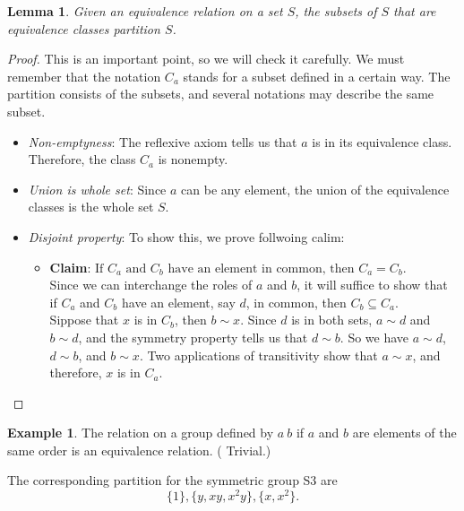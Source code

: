 \documentclass[
]{book}
\providecommand{\tightlist}{%
  \setlength{\itemsep}{0pt}\setlength{\parskip}{0pt}}
\newtheorem{lemma}{Lemma}[chapter]
\theoremstyle{definition}
\theoremstyle{definition}
\newtheorem{example}{Example}[chapter]
\theoremstyle{definition}
\theoremstyle{definition}
\theoremstyle{remark}
\begin{document}
\begin{lemma}
\protect\hypertarget{lem:unnamed-chunk-34}{}\label{lem:unnamed-chunk-34}Given an equivalence relation on a set \(S\), the subsets of \(S\) that are equivalence classes partition \(S\).
\end{lemma}

\begin{proof}

This is an important point, so we will check it carefully. We must remember that the notation \(C_a\) stands for a subset defined in a certain way. The partition consists of the subsets, and several notations may describe the same subset.

\begin{itemize}
\item
  \emph{Non-emptyness}: The reflexive axiom tells us that \(a\) is in its equivalence class. Therefore, the class \(C_a\) is nonempty.
\item
  \emph{Union is whole set}: Since \(a\) can be any element, the union of the equivalence classes is the whole set \(S\).
\item
  \emph{Disjoint property}: To show this, we prove follwoing calim:

  \begin{itemize}
  \tightlist
  \item
    \textbf{Claim}: \(\text{If } C_a \text{ and } C_b \text{ have an element in common, then } C_a = C_b\).\\
    Since we can interchange the roles of \(a\) and \(b\), it will suffice to show that if \(C_a\) and \(C_b\) have an element, say \(d\), in common, then \(C_b \subseteq C_a\).\\
    Sippose that \(x\) is in \(C_b\), then \(b \sim x\). Since \(d\) is in both sets, \(a \sim d\) and \(b \sim d\), and the symmetry property tells us that \(d \sim b\). So we have \(a \sim d\), \(d \sim b\), and \(b \sim x\). Two applications of transitivity show that \(a \sim x\), and therefore, \(x\) is in \(C_a\).
  \end{itemize}
\end{itemize}

\end{proof}

\begin{example}
\protect\hypertarget{exm:272}{}\label{exm:272}The relation on a group defined by \(a ~ b\) if \(a\) and \(b\) are elements of the same order is an equivalence relation. ( Trivial.)

The corresponding partition for the symmetric group S3 are
\[\{1\}, \{y, xy, x^2y\}, \{x, x^2\}.\]
\end{example}
\end{document}
